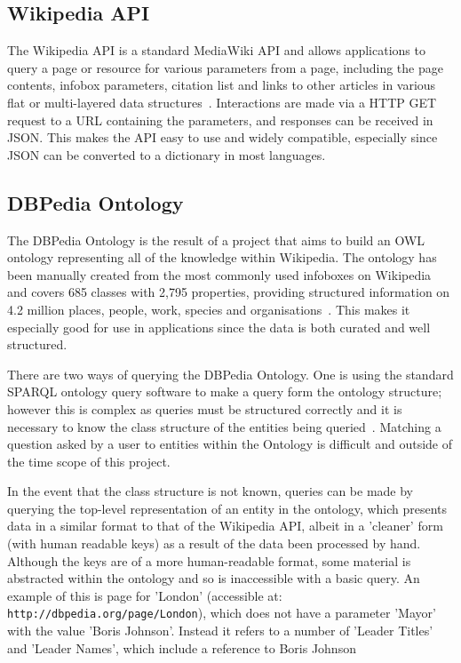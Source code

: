 \documentclass[authoryearcitations]{UoYCSproject}
\begin{document}
\subsection{Wikipedia API}
The Wikipedia API is a standard MediaWiki API and allows applications to query a page or resource for various parameters from a page, including the page contents, infobox parameters, citation list and links to other articles in various flat or multi-layered data structures~\cite{mediaWikiAPI}.  Interactions are made via a HTTP GET request to a URL containing the parameters, and responses can be received in JSON.  This makes the API easy to use and widely compatible, especially since JSON can be converted to a dictionary in most languages.

\subsection{DBPedia Ontology}
\label{subsec:dbpediaOntology}
The DBPedia Ontology is the result of a project that aims to build an OWL ontology representing all of the knowledge within Wikipedia.  The ontology has been manually created from the most commonly used infoboxes on Wikipedia and covers 685 classes with 2,795 properties, providing structured information on 4.2 million places, people, work, species and organisations~\cite{dbPediaIntro}.  This makes it especially good for use in applications since the data is both curated and well structured.

There are two ways of querying the DBPedia Ontology.  One is using the standard SPARQL ontology query software to make a query form the ontology structure; however this is complex as queries must be structured correctly and it is necessary to know the class structure of the entities being queried~\cite{dbPediaSparql}. Matching a question asked by a user to entities within the Ontology is difficult and outside of the time scope of this project.

In the event that the class structure is not known, queries can be made by querying the top-level representation of an entity in the ontology, which presents data in a similar format to that of the Wikipedia API, albeit in a 'cleaner' form (with human readable keys) as a result of the data been processed by hand.  Although the keys are of a more human-readable format, some material is abstracted within the ontology and so is inaccessible with a basic query.  An example of this is page for 'London' (accessible at: \texttt{http://dbpedia.org/page/London}), which does not have a parameter 'Mayor' with the value 'Boris Johnson'.  Instead it refers to a number of 'Leader Titles' and 'Leader Names', which include a reference to Boris Johnson
\end{document}
